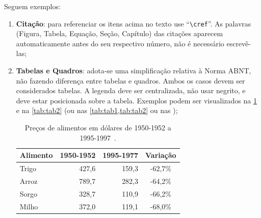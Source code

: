Seguem exemplos:
\begin{enumerate}[label=(\Roman*)]
	\item \textbf{Citação}: para referenciar os itens acima no texto use ``\texttt{\textbackslash cref}''. As palavras (Figura, Tabela, Equação, Seção, Capítulo) das citações aparecem automaticamente antes do seu respectivo número, não é necessário escrevê-las;
	
	\item \textbf{Tabelas e Quadros}: adota-se uma simplificação relativa à Norma ABNT, não fazendo diferença entre tabelas e quadros. Ambos os casos devem ser considerados tabelas. A legenda deve ser centralizada, não usar negrito, e deve estar posicionada sobre a tabela. Exemplos podem ser visualizados na \cref{tab:tab1} e na \cref{tab:tab2} (ou nas \cref{tab:tab1,tab:tab2} ou nas );
	
	
	\begin{table}[H]
		\centering
		\caption[Preços de alimentos em dólares de 1950-1952 a 1995-1997.]{Preços de alimentos em dólares de 1950-1952 a 1995-1997~\citep{DET70}.}
		\label{tab:tab1}
		\begin{tabular}{lrrc} \hline
			\textbf{Alimento} & \textbf{1950-1952} & \textbf{1995-1977} & \textbf{Variação} \\ \hline
			Trigo    & 427,6     & 159,3     & -62,7\%  \\
			Arroz    & 789,7     & 282,3     & -64,2\%  \\
			Sorgo    & 328,7     & 110,9     & -66,2\%  \\
			Milho    & 372,0     & 119,1     & -68,0\%  \\ \hline
		\end{tabular}
	\end{table}
	

\end{enumerate}
